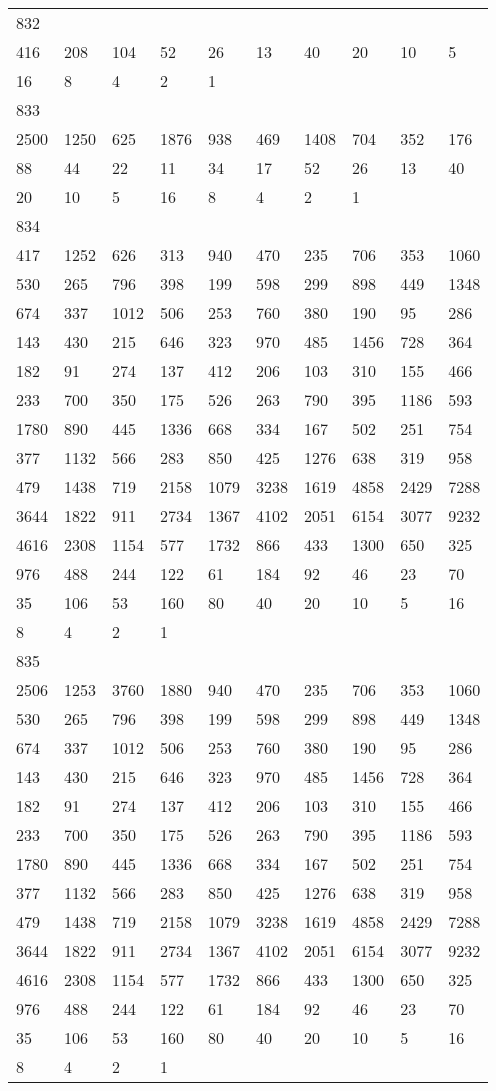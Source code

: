 \begin{longtable}{*{10}{l}}
832&&&&&&&&&\\
416& 208& 104& 52& 26& 13& 40& 20& 10& 5\\
16& 8& 4& 2& 1& \\

833&&&&&&&&&\\
2500& 1250& 625& 1876& 938& 469& 1408& 704& 352& 176\\
88& 44& 22& 11& 34& 17& 52& 26& 13& 40\\
20& 10& 5& 16& 8& 4& 2& 1& \\

834&&&&&&&&&\\
417& 1252& 626& 313& 940& 470& 235& 706& 353& 1060\\
530& 265& 796& 398& 199& 598& 299& 898& 449& 1348\\
674& 337& 1012& 506& 253& 760& 380& 190& 95& 286\\
143& 430& 215& 646& 323& 970& 485& 1456& 728& 364\\
182& 91& 274& 137& 412& 206& 103& 310& 155& 466\\
233& 700& 350& 175& 526& 263& 790& 395& 1186& 593\\
1780& 890& 445& 1336& 668& 334& 167& 502& 251& 754\\
377& 1132& 566& 283& 850& 425& 1276& 638& 319& 958\\
479& 1438& 719& 2158& 1079& 3238& 1619& 4858& 2429& 7288\\
3644& 1822& 911& 2734& 1367& 4102& 2051& 6154& 3077& 9232\\
4616& 2308& 1154& 577& 1732& 866& 433& 1300& 650& 325\\
976& 488& 244& 122& 61& 184& 92& 46& 23& 70\\
35& 106& 53& 160& 80& 40& 20& 10& 5& 16\\
8& 4& 2& 1& \\

835&&&&&&&&&\\
2506& 1253& 3760& 1880& 940& 470& 235& 706& 353& 1060\\
530& 265& 796& 398& 199& 598& 299& 898& 449& 1348\\
674& 337& 1012& 506& 253& 760& 380& 190& 95& 286\\
143& 430& 215& 646& 323& 970& 485& 1456& 728& 364\\
182& 91& 274& 137& 412& 206& 103& 310& 155& 466\\
233& 700& 350& 175& 526& 263& 790& 395& 1186& 593\\
1780& 890& 445& 1336& 668& 334& 167& 502& 251& 754\\
377& 1132& 566& 283& 850& 425& 1276& 638& 319& 958\\
479& 1438& 719& 2158& 1079& 3238& 1619& 4858& 2429& 7288\\
3644& 1822& 911& 2734& 1367& 4102& 2051& 6154& 3077& 9232\\
4616& 2308& 1154& 577& 1732& 866& 433& 1300& 650& 325\\
976& 488& 244& 122& 61& 184& 92& 46& 23& 70\\
35& 106& 53& 160& 80& 40& 20& 10& 5& 16\\
8& 4& 2& 1& \\


\end{longtable}
